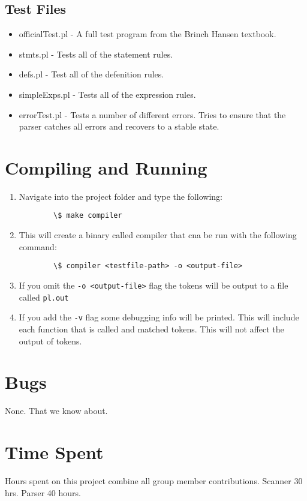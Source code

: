 \documentclass{article}
\begin{document}
\subsection{Test Files}
\begin{itemize}
	\item officialTest.pl - A full test program from the Brinch Hansen textbook.
  \item stmts.pl - Tests all of the statement rules.
  \item defs.pl - Test all of the defenition rules.
  \item simpleExps.pl - Tests all of the expression rules.
  \item errorTest.pl - Tests a number of different errors. Tries to ensure that the parser catches all errors and recovers to a stable state.
\end{itemize}

\section{Compiling and Running}
\begin{enumerate}
	\item Navigate into the project folder and type the following:

\verb|        \$ make compiler|

	\item This will create a binary called compiler that cna be run with the following command:

\verb|        \$ compiler <testfile-path> -o <output-file>|

	\item If you omit the \verb|-o <output-file>| flag the tokens will be output to a file called \verb|pl.out|
	\item If you add the \verb|-v| flag some debugging info will be printed. This will include each function that is called and matched tokens. This will not affect the output of tokens.
\end{enumerate}

\section{Bugs}
None. That we know about.


\section{Time Spent}
Hours spent on this project combine all group member contributions. Scanner 30 hrs. Parser 40 hours.
\end{document}
